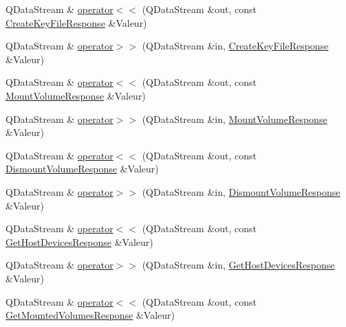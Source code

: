 \begin{DoxyCompactItemize}
Q\+Data\+Stream \& \hyperlink{namespace_gost_crypt_1_1_core_a053cb74cb25b72b213771b5c043ad625}{operator$<$$<$} (Q\+Data\+Stream \&out, const \hyperlink{struct_gost_crypt_1_1_core_1_1_create_key_file_response}{Create\+Key\+File\+Response} \&Valeur)
\item 
Q\+Data\+Stream \& \hyperlink{namespace_gost_crypt_1_1_core_a3b0ff848a75ff639ef1e6fb9b517dda7}{operator$>$$>$} (Q\+Data\+Stream \&in, \hyperlink{struct_gost_crypt_1_1_core_1_1_create_key_file_response}{Create\+Key\+File\+Response} \&Valeur)
\item 
Q\+Data\+Stream \& \hyperlink{namespace_gost_crypt_1_1_core_aa1eafda975ed8369f7dbd969b4a57232}{operator$<$$<$} (Q\+Data\+Stream \&out, const \hyperlink{struct_gost_crypt_1_1_core_1_1_mount_volume_response}{Mount\+Volume\+Response} \&Valeur)
\item 
Q\+Data\+Stream \& \hyperlink{namespace_gost_crypt_1_1_core_afdc228972f71299f3cc1586b98e724d4}{operator$>$$>$} (Q\+Data\+Stream \&in, \hyperlink{struct_gost_crypt_1_1_core_1_1_mount_volume_response}{Mount\+Volume\+Response} \&Valeur)
\item 
Q\+Data\+Stream \& \hyperlink{namespace_gost_crypt_1_1_core_a50717fd83a50d35d5362503effad3dc5}{operator$<$$<$} (Q\+Data\+Stream \&out, const \hyperlink{struct_gost_crypt_1_1_core_1_1_dismount_volume_response}{Dismount\+Volume\+Response} \&Valeur)
\item 
Q\+Data\+Stream \& \hyperlink{namespace_gost_crypt_1_1_core_a6803c8e33f7fb6fcfc6e720953f0539e}{operator$>$$>$} (Q\+Data\+Stream \&in, \hyperlink{struct_gost_crypt_1_1_core_1_1_dismount_volume_response}{Dismount\+Volume\+Response} \&Valeur)
\item 
Q\+Data\+Stream \& \hyperlink{namespace_gost_crypt_1_1_core_ac9374a55d3cf082a48ed8cb39a63cd1d}{operator$<$$<$} (Q\+Data\+Stream \&out, const \hyperlink{struct_gost_crypt_1_1_core_1_1_get_host_devices_response}{Get\+Host\+Devices\+Response} \&Valeur)
\item 
Q\+Data\+Stream \& \hyperlink{namespace_gost_crypt_1_1_core_a8c89beaede22c1bdfe978d8ab3f1e542}{operator$>$$>$} (Q\+Data\+Stream \&in, \hyperlink{struct_gost_crypt_1_1_core_1_1_get_host_devices_response}{Get\+Host\+Devices\+Response} \&Valeur)
\item 
Q\+Data\+Stream \& \hyperlink{namespace_gost_crypt_1_1_core_ad2b088c1aa6fe987f0faaaba246c156a}{operator$<$$<$} (Q\+Data\+Stream \&out, const \hyperlink{struct_gost_crypt_1_1_core_1_1_get_mounted_volumes_response}{Get\+Mounted\+Volumes\+Response} \&Valeur)
\item 

\end{DoxyCompactItemize}
